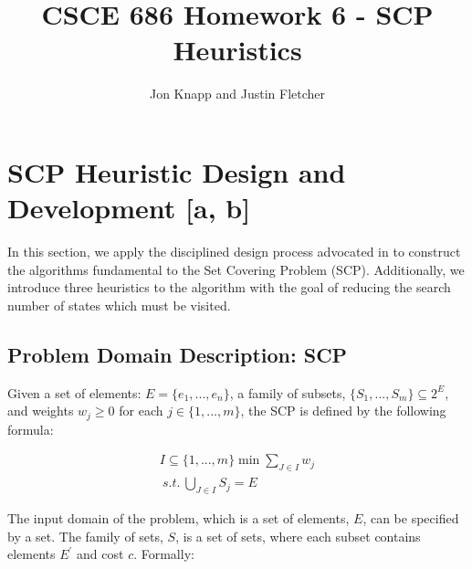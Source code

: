 \documentclass[12pt]{article}
\begin{document}
	
	\title{CSCE 686 Homework 6 - SCP Heuristics}
	\author{Jon Knapp and Justin Fletcher}
	\maketitle
	
	\section{SCP Heuristic Design and Development [a, b]} \label{scn:design}
	
	In this section, we apply the disciplined design process advocated in \cite{ClassNotes686} to construct the algorithms fundamental to the Set Covering Problem (SCP). Additionally, we introduce three heuristics to the algorithm with the goal of reducing the search number of states which must be visited.
	
	\subsection{Problem Domain Description: SCP}
	Given a set of elements: $E=\{e_1,...,e_n\}$, a family of subsets, $\{S_1,...,S_m\}\subseteq 2^E$, and weights $w_j \geq 0$ for each $j\in\{1,...,m\}$, the SCP is defined by the following formula:
	
	\begin{align*}
	I \subseteq \{1,...,m\} \min \sum_{J \in I} w_j \\
	\:s.t.\: \bigcup_{J \in I} S_j = E
	\end{align*}
	
	
	The input domain of the problem, which is a set of elements, $E$, can be specified by a set. The family of sets, $S$, is a set of sets, where each subset contains elements $E^\prime$ and cost $c$. Formally:
	
\end{document}
